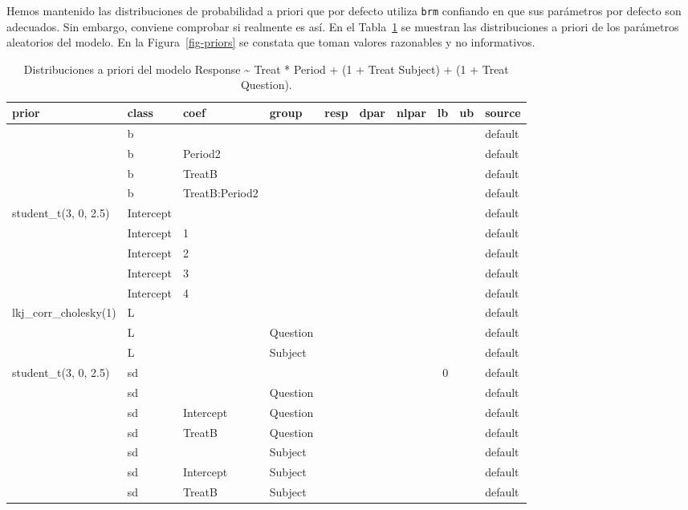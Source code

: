\documentclass[
  12pt,
  a4paper,
  extrafontsizes,
  onecolumn,
  openright]{memoir}
\begin{document}
\normalsize

Hemos mantenido las distribuciones de probabilidad a priori que por
defecto utiliza \texttt{brm} confiando en que sus parámetros por defecto
son adecuados. Sin embargo, conviene comprobar si realmente es así. En
el Tabla~\ref{tbl-priors} se muestran las distribuciones a priori de los
parámetros aleatorios del modelo. En la Figura~\ref{fig-priors} se
constata que toman valores razonables y no informativos.

\tiny

\hypertarget{tbl-priors}{}
\begin{longtable}{llllrrrrrl}
\caption{\label{tbl-priors}Distribuciones a priori del modelo Response \textasciitilde{} Treat *
Period + (1 + Treat \textbar{} Subject) + (1 + Treat \textbar{}
Question). }\tabularnewline

\toprule
prior & class & coef & group & resp & dpar & nlpar & lb & ub & source \\ 
\midrule
 & b &  &  &  &  &  &  &  & default \\ 
 & b & Period2 &  &  &  &  &  &  & default \\ 
 & b & TreatB &  &  &  &  &  &  & default \\ 
 & b & TreatB:Period2 &  &  &  &  &  &  & default \\ 
student\_t(3, 0, 2.5) & Intercept &  &  &  &  &  &  &  & default \\ 
 & Intercept & 1 &  &  &  &  &  &  & default \\ 
 & Intercept & 2 &  &  &  &  &  &  & default \\ 
 & Intercept & 3 &  &  &  &  &  &  & default \\ 
 & Intercept & 4 &  &  &  &  &  &  & default \\ 
lkj\_corr\_cholesky(1) & L &  &  &  &  &  &  &  & default \\ 
 & L &  & Question &  &  &  &  &  & default \\ 
 & L &  & Subject &  &  &  &  &  & default \\ 
student\_t(3, 0, 2.5) & sd &  &  &  &  &  & 0 &  & default \\ 
 & sd &  & Question &  &  &  &  &  & default \\ 
 & sd & Intercept & Question &  &  &  &  &  & default \\ 
 & sd & TreatB & Question &  &  &  &  &  & default \\ 
 & sd &  & Subject &  &  &  &  &  & default \\ 
 & sd & Intercept & Subject &  &  &  &  &  & default \\ 
 & sd & TreatB & Subject &  &  &  &  &  & default \\ 
\bottomrule
\end{longtable}
\end{document}
